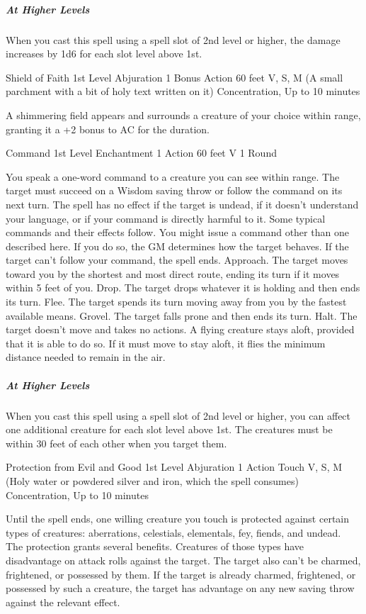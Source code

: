 \documentclass[letterpaper,openany,oneside,twocolumn]{book}
\begin{document}
\subparagraph*{At Higher Levels} When you cast this spell using a spell slot of 2nd level or higher, the damage increases by 1d6 for each slot level above 1st.

\DndSpellHeader
  {Shield of Faith}
  {1st Level Abjuration}
  {1 Bonus Action}
  {60 feet}
  {V, S, M (A small parchment with a bit of holy text written on it)}
  {Concentration, Up to 10 minutes}
  
A shimmering field appears and surrounds a creature of your choice within range, granting it a +2 bonus to AC for the duration.

\DndSpellHeader
  {Command}
  {1st Level Enchantment}
  {1 Action}
  {60 feet}
  {V}
  {1 Round}
  
You speak a one-word command to a creature you can see within range. The target must succeed on a Wisdom saving throw or follow the command on its next turn. The spell has no effect if the target is undead, if it doesn’t understand your language, or if your command is directly harmful to it. Some typical commands and their effects follow. You might issue a command other than one described here. If you do so, the GM determines how the target behaves. If the target can’t follow your command, the spell ends. Approach. The target moves toward you by the shortest and most direct route, ending its turn if it moves within 5 feet of you. Drop. The target drops whatever it is holding and then ends its turn. Flee. The target spends its turn moving away from you by the fastest available means. Grovel. The target falls prone and then ends its turn. Halt. The target doesn’t move and takes no actions. A flying creature stays aloft, provided that it is able to do so. If it must move to stay aloft, it flies the minimum distance needed to remain in the air.

\subparagraph*{At Higher Levels} When you cast this spell using a spell slot of 2nd level or higher, you can affect one additional creature for each slot level above 1st. The creatures must be within 30 feet of each other when you target them.

\DndSpellHeader
  {Protection from Evil and Good}
  {1st Level Abjuration}
  {1 Action}
  {Touch}
  {V, S, M (Holy water or powdered silver and iron, which the spell consumes)}
  {Concentration, Up to 10 minutes}
  
Until the spell ends, one willing creature you touch is protected against certain types of creatures: aberrations, celestials, elementals, fey, fiends, and undead.\\
The protection grants several benefits. Creatures of those types have disadvantage on attack rolls against the target. The target also can’t be charmed, frightened, or possessed by them. If the target is already charmed, frightened, or possessed by such a creature, the target has advantage on any new saving throw against the relevant effect.
\end{document}
